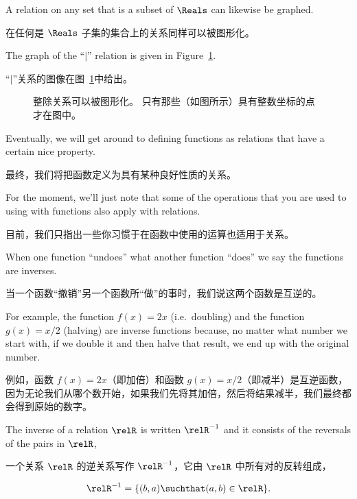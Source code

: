 A relation on any set that is a subset of $\Reals$ can likewise be
graphed.

在任何是 $\Reals$ 子集的集合上的关系同样可以被图形化。

The graph of the ``$\mid$'' relation is
given in Figure~\ref{fig:div_graph}.

“$\mid$”关系的图像在图~\ref{fig:div_graph}中给出。

\begin{figure}[!hbtp]
\begin{center}

\end{center}
\caption[The graph of the divisibility relation.]{The divisibility relation %
can be graphed.
Only those points (as indicated) with integer coordinates %
are in the graph.}
\caption[整除关系的图像。]{整除关系可以被图形化。
只有那些（如图所示）具有整数坐标的点才在图中。}
\label{fig:div_graph} 
\end{figure}
 
Eventually, we will get around to defining functions as relations that
have a certain nice property.

最终，我们将把函数定义为具有某种良好性质的关系。

For the moment, we'll just note that
some of the operations that you are used to using with functions
also apply with relations.

目前，我们只指出一些你习惯于在函数中使用的运算也适用于关系。

When one function ``undoes'' what another
function ``does'' we say the functions are inverses.

当一个函数“撤销”另一个函数所“做”的事时，我们说这两个函数是互逆的。

For example,
the function $f(x)=2x$ (i.e.\ doubling) and the function $g(x)=x/2$ (halving)
are inverse functions because, no matter what number we start with, if we
double it and then halve that result, we end up with the original number.

例如，函数 $f(x)=2x$（即加倍）和函数 $g(x)=x/2$（即减半）是互逆函数，因为无论我们从哪个数开始，如果我们先将其加倍，然后将结果减半，我们最终都会得到原始的数字。

The inverse of a relation $\relR$ is written $\relR^{-1}$ and it consists of
the reversals of the pairs in $\relR$,

一个关系 $\relR$ 的逆关系写作 $\relR^{-1}$，它由 $\relR$ 中所有对的反转组成，

\[ \relR^{-1} = \{ (b,a) \suchthat (a,b) \in \relR \}.
\]

